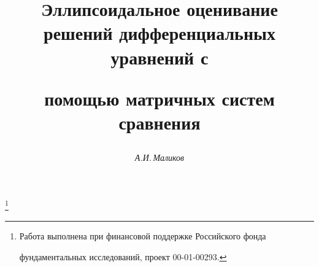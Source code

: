 

 








\newcommand{\Tr}{\operatorname{Tr}} 


\newcommand{\const}{\operatorname{const}} 


\newcommand{\diag}{\operatorname{diag}} 


\newcommand{\tts}[1]{} 




 




\setcounter{page}{30} 












 


\author{\it А.И.\,Маликов} 




\title{Эллипсоидальное оценивание решений дифференциальных уравнений с 


помощью матричных систем сравнения} 


\thanks{Работа выполнена при финансовой поддержке Российского фонда 


фундаментальных исследований, проект 00-01-00293.} 


 


\date{} 




\pagestyle{plain} %


